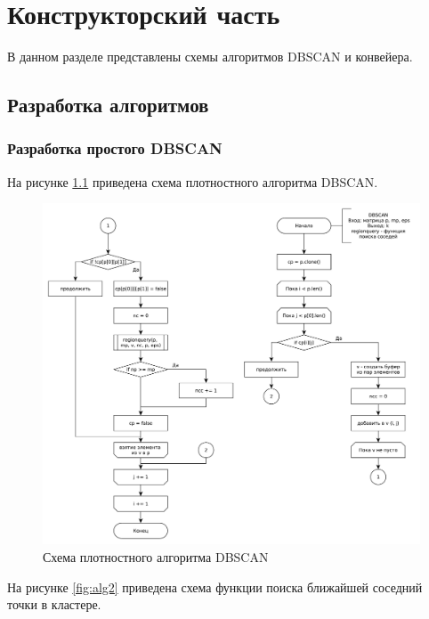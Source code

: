 \chapter{Конструкторский часть}

В данном разделе представлены схемы алгоритмов DBSCAN и конвейера.

\section{Разработка алгоритмов}

\subsection{Разработка простого DBSCAN}
 
На рисунке \ref{fig:alg} приведена схема плотностного алгоритма DBSCAN.


\begin{figure}[ht!]
	\centering
	\includegraphics[width=1\linewidth]{assets/graphs/dbscan.pdf}
	\caption{Схема плотностного алгоритма DBSCAN}
	\label{fig:alg}
\end{figure}

На рисунке \ref{fig:alg2} приведена схема функции поиска ближайшей соседний точки в кластере.

